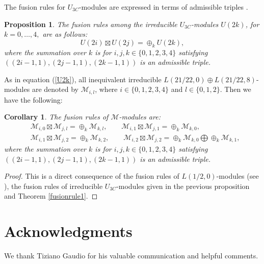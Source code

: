 \documentclass{article}
\newtheorem{corollary}[lemma]{Corollary}
\newtheorem{proposition}[lemma]{Proposition}
\begin{document}
The fusion rules for $U_{3C}$-modules are expressed in terms of admissible triples \cite{DZh}.
\begin{proposition}
	The fusion rules among the irreducible $U_{3C}$-modules $U(2k)$, for $k=0,\dots, 4,$ are as follows:
	$$U(2i)\boxtimes U(2j)=\oplus_{k}U(2k),$$
	where the summation over $k$ is for $i, j, k \in \{0,1,2,3,4\}$ satisfying $((2i-1,1), (2j-1,1),(2k-1,1))$ is an admissible triple.
\end{proposition}\label{3Cfusion}
As in equation (\ref{U2k}), all inequivalent irreducible $L(21/22,0)\oplus L(21/22, 8)$-modules are denoted by $\mathcal{M}_{i,l}$, where $i\in \{0,1,2,3,4\}$ and $l\in \{0,1,2\}$. Then we have the following:
\begin{corollary}  The fusion rules of $\mathcal M$-modules are:
	\begin{align*}
		&\mathcal{M}_{i,0}\boxtimes \mathcal{M}_{j,l}=\oplus_k \mathcal{M}_{k,l},\quad \quad \mathcal{M}_{i,1}\boxtimes \mathcal{M}_{j,1}=\oplus_k \mathcal{M}_{k,0},\\
		&\mathcal{M}_{i,1}\boxtimes \mathcal{M}_{j,2}=\oplus_k \mathcal{M}_{k,2},\quad \quad \mathcal{M}_{i,2}\boxtimes \mathcal{M}_{j,2}=\oplus_k \mathcal{M}_{k,0} \bigoplus \oplus_k \mathcal{M}_{k,1},
	\end{align*}
	where the summation over $k$ is for $i, j, k \in \{0,1,2,3,4\}$ satisfying $((2i-1,1), (2j-1,1),(2k-1,1))$ is an admissible triple.
\end{corollary}
\begin{proof}
	This is a direct consequence of the fusion rules of $L(1/2,0)$-modules (see \cite{DMZ,W}), the fusion rules of irreducible $U_{3C}$-modules given in the previous proposition and Theorem \ref{fusionrule1}.
\end{proof}

\section*{Acknowledgments}

We thank Tiziano Gaudio for his valuable communication and helpful comments.

\end{document}
